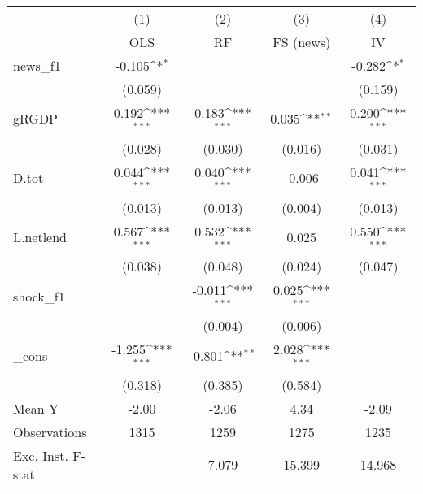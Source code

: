 {
\def\sym#1{\ifmmode^{#1}\else\(^{#1}\)\fi}
\begin{tabular}{l*{4}{c}}
\toprule
            &\multicolumn{1}{c}{(1)}&\multicolumn{1}{c}{(2)}&\multicolumn{1}{c}{(3)}&\multicolumn{1}{c}{(4)}\\
            &\multicolumn{1}{c}{OLS}&\multicolumn{1}{c}{RF}&\multicolumn{1}{c}{FS (news)}&\multicolumn{1}{c}{IV}\\
\midrule
news\_f1     &      -0.105\sym{*}  &                     &                     &      -0.282\sym{*}  \\
            &     (0.059)         &                     &                     &     (0.159)         \\
\addlinespace
gRGDP       &       0.192\sym{***}&       0.183\sym{***}&       0.035\sym{**} &       0.200\sym{***}\\
            &     (0.028)         &     (0.030)         &     (0.016)         &     (0.031)         \\
\addlinespace
D.tot       &       0.044\sym{***}&       0.040\sym{***}&      -0.006         &       0.041\sym{***}\\
            &     (0.013)         &     (0.013)         &     (0.004)         &     (0.013)         \\
\addlinespace
L.netlend   &       0.567\sym{***}&       0.532\sym{***}&       0.025         &       0.550\sym{***}\\
            &     (0.038)         &     (0.048)         &     (0.024)         &     (0.047)         \\
\addlinespace
shock\_f1    &                     &      -0.011\sym{***}&       0.025\sym{***}&                     \\
            &                     &     (0.004)         &     (0.006)         &                     \\
\addlinespace
\_cons      &      -1.255\sym{***}&      -0.801\sym{**} &       2.028\sym{***}&                     \\
            &     (0.318)         &     (0.385)         &     (0.584)         &                     \\
\midrule
Mean Y      &       -2.00         &       -2.06         &        4.34         &       -2.09         \\
Observations&        1315         &        1259         &        1275         &        1235         \\
Exc. Inst. F-stat&                     &       7.079         &      15.399         &      14.968         \\
\bottomrule
\end{tabular}
}
